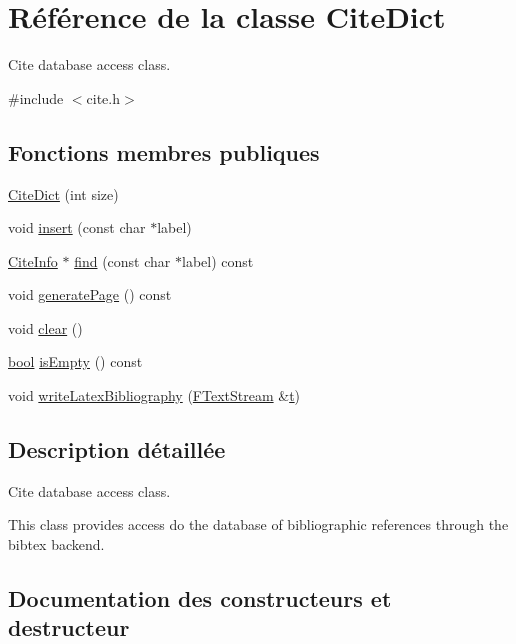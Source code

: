 \hypertarget{class_cite_dict}{}\section{Référence de la classe Cite\+Dict}
\label{class_cite_dict}


Cite database access class.  




{\ttfamily \#include $<$cite.\+h$>$}

\subsection*{Fonctions membres publiques}
\begin{DoxyCompactItemize}
\item 
\hyperlink{class_cite_dict_a7d6745b98d4566463c2aa12bbfa65f4e}{Cite\+Dict} (int size)
\item 
void \hyperlink{class_cite_dict_a1943f09412692299a6286a441ca1a01b}{insert} (const char $\ast$label)
\item 
\hyperlink{struct_cite_info}{Cite\+Info} $\ast$ \hyperlink{class_cite_dict_acc5cb51064eb42b801ff2ae18a110b78}{find} (const char $\ast$label) const 
\item 
void \hyperlink{class_cite_dict_a91ef397962cb60584010cd486d2acc9f}{generate\+Page} () const 
\item 
void \hyperlink{class_cite_dict_a35183cd5038e60f747dd9ecd6bb64f73}{clear} ()
\item 
\hyperlink{qglobal_8h_a1062901a7428fdd9c7f180f5e01ea056}{bool} \hyperlink{class_cite_dict_a0b6de9a4eecdbcfd68b24671908cf97a}{is\+Empty} () const 
\item 
void \hyperlink{class_cite_dict_a3b20f1fad3c4768501c7667ce73cacde}{write\+Latex\+Bibliography} (\hyperlink{class_f_text_stream}{F\+Text\+Stream} \&\hyperlink{058__bracket__recursion_8tcl_a69e959f6901827e4d8271aeaa5fba0fc}{t})
\end{DoxyCompactItemize}


\subsection{Description détaillée}
Cite database access class. 

This class provides access do the database of bibliographic references through the bibtex backend. 

\subsection{Documentation des constructeurs et destructeur}
\hypertarget{class_cite_dict_a7d6745b98d4566463c2aa12bbfa65f4e}{}
